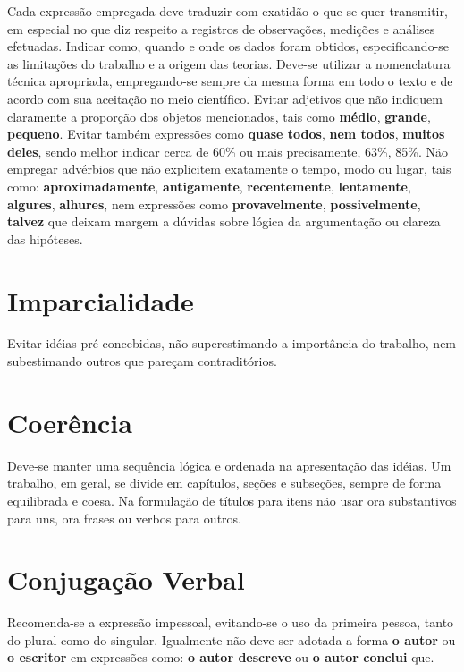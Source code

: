 \documentclass[repeatfields,xlists,xpacks,oneside,yearsonly]{ufrgscca}
\begin{document}
\begin{annex}
        Cada expressão empregada deve traduzir com exatidão o que se quer
        transmitir, em especial no que diz respeito a registros de observações,
        medições e análises efetuadas. Indicar como, quando e onde os dados foram
        obtidos, especificando-se as limitações do trabalho e a origem das teorias.
        Deve-se utilizar a nomenclatura técnica apropriada, empregando-se sempre da
        mesma forma em todo o texto e de acordo com sua aceitação no meio
        científico. Evitar adjetivos que não indiquem claramente a proporção dos
        objetos mencionados, tais como {\bf médio}, {\bf grande}, {\bf pequeno}.
        Evitar também expressões como {\bf quase todos}, {\bf nem todos}, {\bf
            muitos deles}, sendo melhor indicar cerca de 60\% ou mais precisamente,
        63\%, 85\%. Não empregar advérbios que não explicitem exatamente o tempo,
        modo ou lugar, tais como: {\bf aproximadamente}, {\bf antigamente}, {\bf
            recentemente}, {\bf lentamente}, {\bf algures}, {\bf alhures}, nem
        expressões como {\bf provavelmente}, {\bf possivelmente}, {\bf talvez} que
        deixam margem a dúvidas sobre lógica da argumentação ou clareza das
        hipóteses.

        \section{Imparcialidade}

        Evitar idéias pré-concebidas, não superestimando a importância do trabalho,
        nem subestimando outros que pareçam contraditórios.

        \section{Coerência}

        Deve-se manter uma sequência lógica e ordenada na apresentação das idéias.
        Um trabalho, em geral, se divide em capítulos, seções e subseções, sempre de
        forma equilibrada e coesa. Na formulação de títulos para itens não usar ora
        substantivos para uns, ora frases ou verbos para outros.

        \section{Conjugação Verbal}

        Recomenda-se a expressão impessoal, evitando-se o uso da primeira pessoa,
        tanto do plural como do singular. Igualmente não deve ser adotada a forma
        {\bf o autor} ou {\bf o escritor} em expressões como: {\bf o autor descreve}
        ou {\bf o autor conclui} que.\\


\end{annex}
\end{document}
